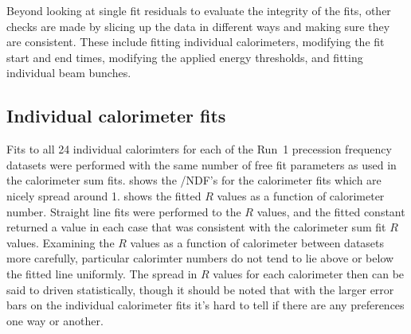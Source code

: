 Beyond looking at single fit residuals to evaluate the integrity of the fits, other checks are made by slicing up the data in different ways and making sure they are consistent. These include fitting individual calorimeters, modifying the fit start and end times, modifying the applied energy thresholds, and fitting individual beam bunches.


\subsection{Individual calorimeter fits}
\label{sub:per_calorimeter_fits}


Fits to all 24 individual calorimters for each of the Run~1 precession frequency datasets were performed with the same number of free fit parameters as used in the calorimeter sum fits.  shows the \chisq/NDF's for the calorimeter fits which are nicely spread around 1.  shows the fitted $R$ values as a function of calorimeter number. Straight line fits were performed to the $R$ values, and the fitted constant returned a value in each case that was consistent with the calorimeter sum fit $R$ values. Examining the $R$ values as a function of calorimeter between datasets more carefully, particular calorimter numbers do not tend to lie above or below the fitted line uniformly. The spread in $R$ values for each calorimeter then can be said to driven statistically, though it should be noted that with the larger error bars on the individual calorimeter fits it's hard to tell if there are any preferences one way or another.

